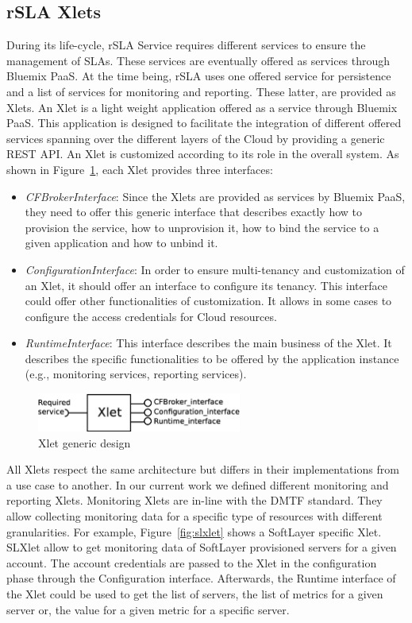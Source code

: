 \subsection{rSLA Xlets}
During its life-cycle, rSLA Service requires different services to ensure the management of SLAs. These services are eventually offered as services through Bluemix PaaS. At the 
time being, rSLA uses one offered service for persistence and a list of services for monitoring and reporting. These latter, are provided as Xlets. An Xlet is a light weight 
application offered as a service through Bluemix PaaS. This application is designed to facilitate the integration of different offered services spanning over the different layers 
of the Cloud by providing a generic REST API. An Xlet is customized according to its role in the overall system. As shown in Figure~\ref{fig:xlet}, each Xlet provides three 
interfaces:
\begin{itemize}
 \item \emph{CFBrokerInterface}: Since the Xlets are provided as services by Bluemix PaaS, they need to offer this generic interface that describes exactly how to provision the 
service, how to unprovision it, how to bind the service to a given application and how to unbind it. 
\item  \emph{ConfigurationInterface}: In order to ensure multi-tenancy and customization of an Xlet, it should offer an interface to configure its tenancy. This interface could 
offer other functionalities of customization. It allows in some cases to configure the access credentials for Cloud resources.
\item  \emph{RuntimeInterface}: This interface describes the main business of the Xlet. It describes the specific functionalities to be offered by the application instance (e.g., 
monitoring services, reporting services). 
\end{itemize}
\begin{figure}[H]
\centering
\includegraphics[width=0.6\textwidth]{pics/Xlet}
\caption{\label{fig:xlet} Xlet generic design}
\end{figure}

All Xlets respect the same architecture but differs in their implementations from a use case to another. In our current work we defined different monitoring and reporting Xlets. 
Monitoring Xlets are in-line with the DMTF standard. They allow collecting monitoring data for a specific type of resources with different granularities. For example, 
Figure~\ref{fig:slxlet} shows a SoftLayer specific Xlet. SLXlet allow to get monitoring data of SoftLayer provisioned servers for a given account. The account credentials are 
passed to the Xlet in the configuration phase through the Configuration interface. Afterwards, the Runtime interface of the Xlet could be used to get the list of servers, the list 
of metrics for a given server or, the value for a given metric for a specific server.

